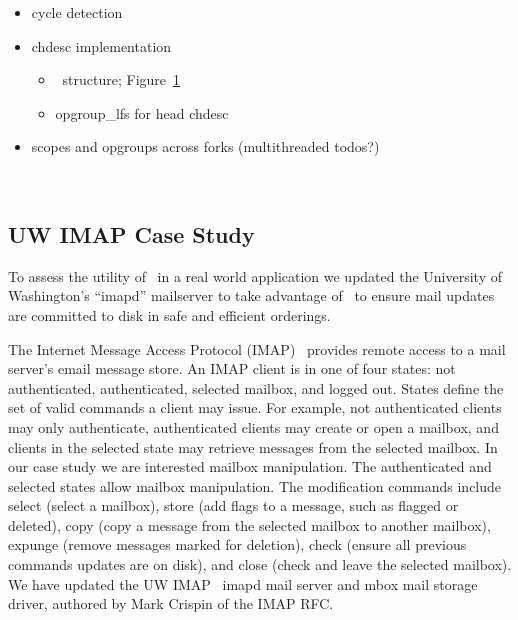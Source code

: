 \begin{itemize}
\item cycle detection
\item chdesc implementation
  \begin{itemize}
  \item \chdesc\ structure; Figure~\ref{fig:opgroup-chdescs}
  \item opgroup\_lfs for head chdesc
  \end{itemize}
\item scopes and opgroups across forks (multithreaded todos?)
\end{itemize}

\begin{figure}[htb]
\caption{\label{fig:opgroup-chdescs} \Opgroup\ \chdescs}
\end{figure}

\subsection{UW IMAP Case Study}
\label{sec:opgroup:uwimap}

To assess the utility of \opgroups\ in a real world application we
updated the University of Washington's ``imapd'' mailserver to take
advantage of \opgroups\ to ensure mail updates are committed to disk
in safe and efficient orderings.

The Internet Message Access Protocol (IMAP)~\cite{rfc3501} provides
remote access to a mail server's email message store. An IMAP client
is in one of four states: not authenticated, authenticated, selected
mailbox, and logged out. States define the set of valid commands a
client may issue. For example, not authenticated clients may only
authenticate, authenticated clients may create or open a mailbox, and
clients in the selected state may retrieve messages from the selected
mailbox. In our case study we are interested mailbox manipulation. The
authenticated and selected states allow mailbox manipulation. The
modification commands include select (select a mailbox), store (add
flags to a message, such as flagged or deleted), copy (copy a message
from the selected mailbox to another mailbox), expunge (remove
messages marked for deletion), check (ensure all previous commands
updates are on disk), and close (check and leave the selected
mailbox). We have updated the UW IMAP~\cite{uwimap} imapd mail server
and mbox mail storage driver, authored by Mark Crispin of the IMAP RFC.

